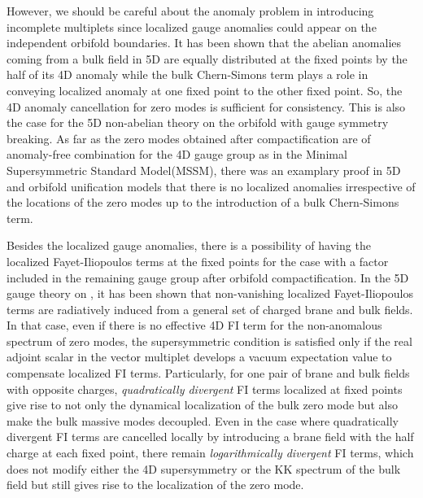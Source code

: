 \documentclass[a4paper,12pt]{article}
\begin{document}
However, we should be careful about the anomaly problem in introducing
incomplete multiplets since localized gauge anomalies could appear on the
independent orbifold boundaries\cite{scrucca,pilo,barbieri,scrucca2,kkl,nilles}.
It has been shown\cite{ah} that the abelian anomalies coming from a bulk 
field in 5D
are equally distributed at the fixed points by the half of its 4D anomaly
while the bulk Chern-Simons term\cite{ch} plays a role
in conveying localized anomaly at one fixed point 
to the other fixed point.
So, the 4D anomaly cancellation for zero modes is sufficient
for consistency. This is also the case for the 5D non-abelian theory on the
orbifold with gauge symmetry breaking.
As far as the zero modes obtained after compactification are of anomaly-free
combination for the 4D gauge group as in the Minimal Supersymmetric Standard
Model(MSSM),
there was an examplary proof in 5D \coordHE{} and \coordHE{} orbifold unification 
models\cite{kkl}
that there is no localized anomalies
irrespective of the locations of the zero modes up to the introduction
of a bulk Chern-Simons term.

Besides the localized gauge anomalies,
there is a possibility of having the localized Fayet-Iliopoulos terms
at the fixed points for the case with a \coordHE{} factor
included in the remaining gauge group after orbifold 
compactification\cite{nilles2,barbieri,nilles,pomarol}.
In the 5D \coordHE{} gauge theory on \coordHE{},
it has been shown that non-vanishing
localized Fayet-Iliopoulos terms are radiatively induced from a general set of
charged brane and bulk fields\cite{nilles}. 
In that case, even if there is no effective 4D
FI term for the non-anomalous spectrum of zero modes,
the supersymmetric condition is satisfied
only if the real adjoint scalar in the vector multiplet develops
a vacuum expectation value to compensate 
localized FI terms\cite{peskin,ah2,barbieri,nilles,pomarol}.
Particularly, for one pair of brane and bulk fields with opposite charges,
{\it quadratically divergent} FI terms localized at fixed points
give rise to not only
the dynamical localization of the bulk zero mode 
but also make the bulk massive modes decoupled. 
Even in the case
where quadratically divergent FI terms are cancelled locally
by introducing a brane field with the half charge 
at each fixed point, there remain
{\it logarithmically divergent} FI terms,
which does not modify either
the 4D supersymmetry or the KK spectrum of the bulk field
but still gives rise to the localization of the zero mode\cite{nilles}.
\end{document}
